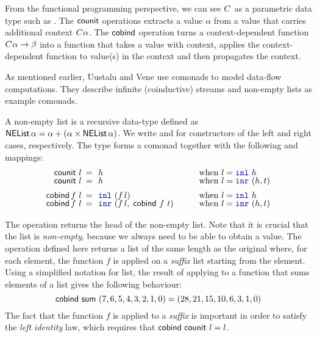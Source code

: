 \noindent
From the functional programming perspective, we can see $C^{}$ as a parametric data type such as
. The $\textnormal{\sffamily counit}$ operations extracts a value $\alpha$ from a value that carries 
additional context $C^{}\alpha$. The $\textnormal{\sffamily cobind}$ operation turns a context-dependent function 
$C^{}\alpha \rightarrow \beta$ into a function that takes a value with context, applies
the context-dependent function to value(s) in the context and then propagates the context.

As mentioned earlier, Uustalu and Vene \cite{comonads-notions} use comonads to model data-flow
computations. They describe infinite (coinductive) streams and non-empty lists as example comonads.

\begin{example}
A non-empty list is a recursive data-type defined as $\ident{NEList}\,\alpha = \alpha + (\alpha \times \ident{NEList}\,\alpha)$.
We write  and  for constructors of the left and right cases, respectively. The 
type  forms a comonad together with the following  and  mappings:
%
\begin{equation*}
\begin{array}{rclll}
\ident{counit}~l &\narrow{=}& h &\quad&\textnormal{when}~l=\kvd{inl}~h\\[-0.25em]
\ident{counit}~l &\narrow{=}& h &&\textnormal{when}~l=\kvd{inr}~(h, t)\\[0.5em]
\ident{cobind}\,f~l &\narrow{=}& \kvd{inl}~(f\,l) &&\textnormal{when}~l=\kvd{inl}~h\\[-0.25em]
\ident{cobind}\,f~l &\narrow{=}& \kvd{inr}~(f\,l,\;\ident{cobind}~f~t) &&\textnormal{when}~l=\kvd{inr}~(h, t)
\end{array}
\end{equation*}
\end{example}

\noindent
The  operation returns the head of the non-empty list. Note that it is crucial that
the list is \emph{non-empty}, because we always need to be able to obtain a value. The 
operation defined here returns a list of the same length as the original where, for each element, the 
function $f$ is applied on a \emph{suffix} list starting from the element. Using a simplified
notation for list, the result of applying  to a function that sums elements of a
list gives the following behaviour:
%
\begin{equation*}
\textnormal{\sffamily cobind}~\textnormal{\sffamily sum}~(7,6,5,4,3,2,1,0) = (28,21,15,10,6,3,1,0)
\end{equation*}
%
The fact that the function $f$ is applied to a \emph{suffix} is important in order to satisfy the
\emph{left identity} law, which requires that $\textnormal{\sffamily cobind}~\textnormal{\sffamily counit}~l = l$.

